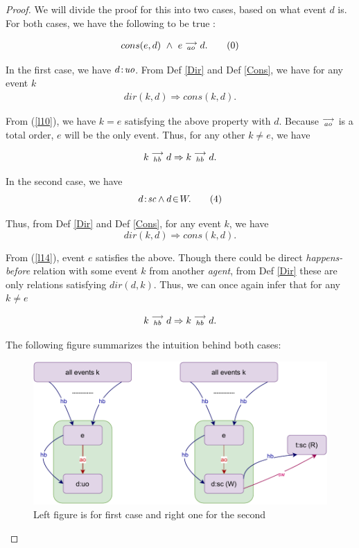 \begin{proof}
    
    We will divide the proof for this into two cases, based on what event $d$ is. For both cases, we have the following to be true :
    
    \begin{align*}
        cons(e,d) \ \wedge \ e\stackrel{\longrightarrow}{_{ao}}d.
        \tag{0}
        \label{l10}
    \end{align*}
        
    In the first case, we have $d\!:\!\textit{uo}$. From Def \ref{Dir} and Def \ref{Cons}, we have for any event $k$
    \begin{align*}
        dir(k,d) \Rightarrow cons(k,d).
    \end{align*}
        
    From (\ref{l10}), we have $k=e$ satisfying the above property with $d$. 
    Because $\stackrel{\longrightarrow}{_{ao}}$ is a total order, $e$ will be the only event. Thus, for any other $k \neq e$, we have 
    
    \begin{align*}
        k\stackrel{\longrightarrow}{_{hb}}d \Rightarrow k\stackrel{\longrightarrow}{_{hb}}d.
    \end{align*}
    
    In the second case, we have 
    \[
        d\!:\!\textit{sc} \wedge d\!\in\!W.
        \tag{4}
        \label{l14}
    \]
    
    Thus, from Def \ref{Dir} and Def \ref{Cons}, for any event $k$, we have 
    \[
        dir(k,d) \Rightarrow cons(k,d).
    \]
    
    From (\ref{l14}), event $e$ satisfies the above.
    Though there could be direct \textit{happens-before} relation with some event $k$ from another \textit{agent}, from Def \ref{Dir} these are only relations satisfying $dir(d,k)$. Thus, we can once again infer that for any $k \neq e$ 
    
    \[
        k\stackrel{\longrightarrow}{_{hb}}d \Rightarrow k\stackrel{\longrightarrow}{_{hb}}d.
    \]
    
    The following figure summarizes the intuition behind both cases: 
    
    \begin{figure}[H]
        \centering
        \includegraphics[scale=0.7]{5.InstructionReordering/3.Lemmas/Lemma1.pdf}
        \caption{Left figure is for first case and right one for the second}
        \label{fig:my_label}
    \end{figure}
    
\end{proof}

